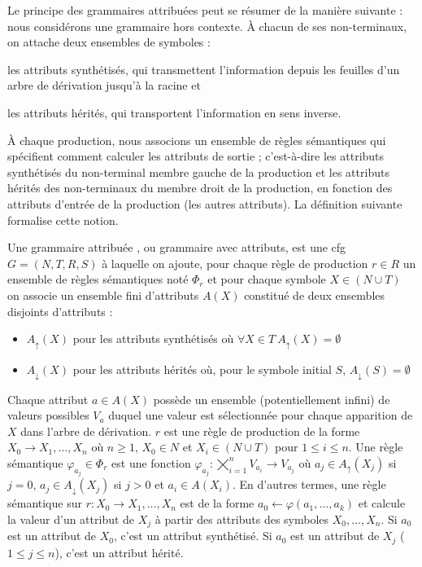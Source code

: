 Le principe des grammaires attribuées peut se résumer de la manière suivante : nous considérons une grammaire hors contexte.
À chacun de ses non-terminaux, on attache deux ensembles de symboles :
\begin{enumerate*}[label=(\arabic*)]
    \item les attributs synthétisés, qui transmettent l'information depuis les feuilles d'un arbre de dérivation jusqu'à la racine et
    \item les attributs hérités, qui transportent l'information en sens inverse.
\end{enumerate*}
À chaque production, nous associons un ensemble de règles sémantiques qui spécifient comment calculer les attributs de sortie ; c'est-à-dire les attributs synthétisés du non-terminal membre gauche de la production et les attributs hérités des non-terminaux du membre droit de la production, en fonction des attributs d'entrée de la production (les autres attributs).
La définition suivante formalise cette notion.

\begin{definition}
    Une grammaire attribuée \cite{knuthSemanticsContextfreeLanguages1968}, ou grammaire avec attributs, est une \gls{cfg} $G = (N, T, R, S)$ à laquelle on ajoute, pour chaque règle de production $r \in R$ un ensemble de règles sémantiques noté $\Phi_r$ et pour chaque symbole $X \in (N \cup T)$ on associe un ensemble fini d'attributs $A(X)$ constitué de deux ensembles disjoints d'attributs :
    \begin{itemize}
        \item $A_\uparrow(X)$ pour les attributs synthétisés où $\forall X \in T ~ A_\uparrow(X) = \emptyset$
        \item $A_\downarrow(X)$ pour les attributs hérités où, pour le symbole initial $S$, $A_\downarrow(S) = \emptyset$
    \end{itemize}
    Chaque attribut $a \in A(X)$ possède un ensemble (potentiellement infini) de valeurs possibles $V_a$ duquel une valeur est sélectionnée pour chaque apparition de $X$ dans l'arbre de dérivation.
    $r$ est une règle de production de la forme $X_0 \to X_1, \dots, X_n$ où $n \ge 1$, $X_0 \in N$ et $X_i \in (N \cup T)$ pour $1 \le i \le n$.
    Une règle sémantique $\varphi_{a_j} \in \Phi_r$ est une fonction $\varphi_{a_j} : \bigtimes_{i = 1}^n V_{a_i} \to V_{a_j}$ où $a_j \in A_\uparrow(X_j)$ si $j = 0$, $a_j \in A_\downarrow(X_j)$ si $j > 0$ et $a_i \in A(X_i)$.
    En d'autres termes, une règle sémantique sur $r: X_0 \to X_1, \dots, X_n$ est de la forme $a_0 \gets \varphi(a_1, \dots, a_k)$ et calcule la valeur d'un attribut de $X_j$ à partir des attributs des symboles $X_0, \dots, X_n$.
    Si $a_0$ est un attribut de $X_0$, c'est un attribut synthétisé.
    Si $a_0$ est un attribut de $X_j$ ($1 \leq j \leq n$), c'est un attribut hérité.
\end{definition}

